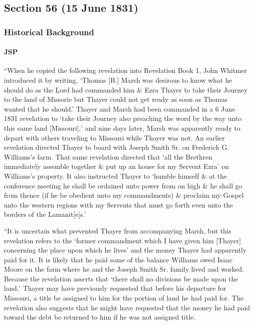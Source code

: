 \subsection{Section 56 (15 June 1831)}
	\label{DC56}
	
	\subsubsection{Historical Background}
		\label{DC56-HB}
		
		\paragraph{JSP}
		
			``When he copied the following revelation into Revelation Book 1, John Whitmer introduced it by writing, `Thomas [B.] Marsh was desirous to know what he should do as the Lord had commanded him \& Ezra Thayer to take their Journey to the land of Missorie but Thayer could not get ready as soon as Thomas wanted that he should.' Thayer and Marsh had been commanded in a 6 June 1831 revelation to `take their Journey also preaching the word by the way unto this same land [Missouri],' and nine days later, Marsh was apparently ready to depart with others traveling to Missouri while Thayer was not. An earlier revelation directed Thayer to board with Joseph Smith Sr. on Frederick G. Williams's farm. That same revelation directed that `all the Brethren immediately assemble together \& put up an house for my Servent Ezra' on Williams's property. It also instructed Thayer to `humble himself \& at the conference meeting he shall be ordained unto power from on high \& he shall go from thence (if he be obedient unto my commandments) \& proclaim my Gospel unto the western regions with my Servents that must go forth even unto the borders of the Lamanit[e]s.'
			
			``It is uncertain what prevented Thayer from accompanying Marsh, but this revelation refers to the `former commandment which I have given him [Thayer] concerning the place upon which he lives' and the money Thayer had apparently paid for it. It is likely that he paid some of the balance Williams owed Isaac Moore on the farm where he and the Joseph Smith Sr. family lived and worked. Because the revelation asserts that `there shall no divisions be made upon the land,' Thayer may have previously requested that before his departure for Missouri, a title be assigned to him for the portion of land he had paid for. The revelation also suggests that he might have requested that the money he had paid toward the debt be returned to him if he was not assigned title.
			
